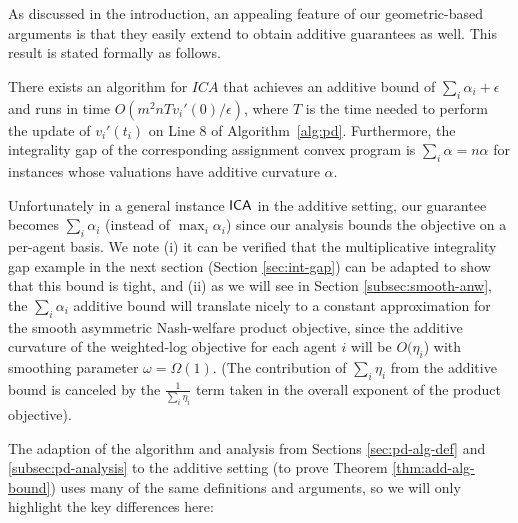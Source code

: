 As discussed in the introduction, an appealing feature of our geometric-based arguments is that they easily extend to obtain additive guarantees as well. This result is stated formally as follows.

\begin{theorem}
\label{thm:add-alg-bound}
There exists an  algorithm for $ICA$ that achieves an additive bound of $\sum_i \alpha_i + \epsilon$ and runs in time $O(m^2nTv_i'(0)/\epsilon)$, 
where $T$ is the time needed to perform the update of $v_i'(t_i)$ on Line 8 of Algorithm~\ref{alg:pd}. Furthermore, the integrality gap of the corresponding assignment convex program is $\sum_i \alpha = n\alpha$ for instances whose valuations have additive curvature $\alpha$.
\end{theorem}

Unfortunately in a general instance $\mathsf{ICA}$ in the additive setting, our guarantee becomes $\sum_i \alpha_i$ (instead of $\max_i \alpha_i$) since our analysis bounds the objective on a per-agent basis.
We note (i) it can be verified that the multiplicative integrality gap example in the next section (Section \ref{sec:int-gap}) can be adapted to show that this bound is tight, and (ii) as we will see in Section \ref{subsec:smooth-anw}, the $\sum_i \alpha_i$ additive bound will translate nicely to a constant approximation for the smooth asymmetric Nash-welfare product objective, since the additive curvature of the weighted-log objective for each agent $i$ will be $O(\eta_i$) with  smoothing parameter $\omega = \Omega(1)$. (The contribution of $\sum_i \eta_i$ from the additive bound is canceled by the $\frac{1}{\sum_i \eta_i}$ term taken in the overall exponent of the product objective). 

The adaption of the algorithm and analysis from Sections \ref{sec:pd-alg-def} and \ref{subsec:pd-analysis} to the additive setting (to prove Theorem \ref{thm:add-alg-bound}) uses many of the same definitions and arguments, so we will only highlight the key differences here:


